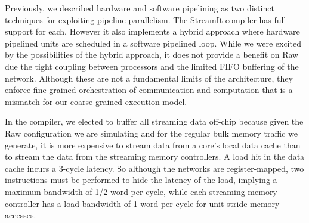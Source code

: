 Previously, we described hardware and software pipelining as two
distinct techniques for exploiting pipeline parallelism.  The StreamIt
compiler has full support for each.  However it also implements a
hybrid approach where hardware pipelined units are scheduled in a
software pipelined loop.  While we were excited by the possibilities
of the hybrid approach, it does not provide a benefit on Raw due the
tight coupling between processors and the limited FIFO buffering of
the network. Although these are not a fundamental limits of the
architecture, they enforce fine-grained orchestration of communication
and computation that is a mismatch for our coarse-grained execution
model.



In the compiler, we elected to buffer all streaming data off-chip
because given the Raw configuration we are simulating and for the
regular bulk memory traffic we generate, it is more expensive to
stream data from a core's local data cache than to stream the data
from the streaming memory controllers. A load hit in the data cache
incurs a 3-cycle latency.  So although the networks are
register-mapped, two instructions must be performed to hide the
latency of the load, implying a maximum bandwidth of 1/2 word per
cycle, while each streaming memory controller has a load bandwidth of
1 word per cycle for unit-stride memory accesses.

